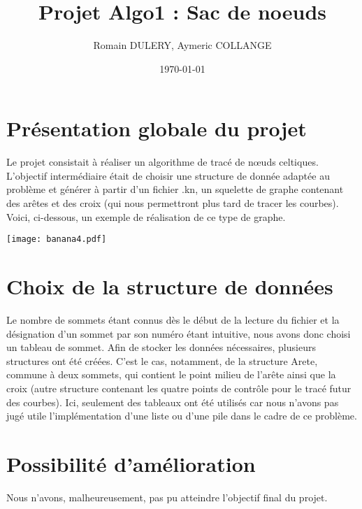 \documentclass[a4paper,11pt]{article}
\title{Projet Algo1 : Sac de noeuds}
\author{Romain DULERY, Aymeric COLLANGE}
\date{\today}
\begin{document}
\maketitle

\section{Présentation globale du projet}

Le projet consistait à réaliser un algorithme de tracé de nœuds celtiques.
L'objectif intermédiaire était de choisir une structure de donnée adaptée au problème et générer à partir d'un fichier .kn, un squelette de graphe contenant des arêtes et des croix (qui nous permettront  plus tard de tracer les courbes).
Voici, ci-dessous, un exemple de réalisation de ce type de graphe.

\texttt{[image: banana4.pdf]}

\section{Choix de la structure de données}

Le nombre de sommets étant connus dès le début de la lecture du fichier et la désignation d'un sommet par son numéro étant intuitive, nous avons donc choisi un tableau de sommet.
Afin de stocker les données nécessaires, plusieurs structures ont été créées. C'est le cas, notamment, de la structure Arete, commune à deux sommets, qui contient le point milieu de l'arête ainsi que la croix (autre structure contenant les quatre points de contrôle pour le tracé futur des courbes).
Ici, seulement des tableaux ont été utilisés car nous n'avons pas jugé utile l'implémentation d'une liste ou d'une pile dans le cadre de ce problème.

\section{Possibilité d'amélioration}

Nous n'avons, malheureusement, pas pu atteindre l'objectif final du projet.
\end{document}
